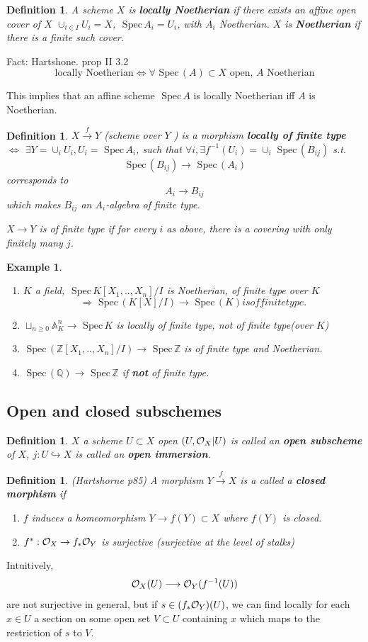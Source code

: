 \documentclass[11pt]{article}
\newtheorem{dfn}[thm]{Definition}
\newtheorem{ex}[thm]{Example}
\newcommand{\spec}{\text{ Spec}\,}
\newcommand{\affn}{\mathbb A}
\newcommand{\intg}{\mathbb Z}
\newcommand{\ratl}{\mathbb Q}
\newcommand{\calo}{{\cal O}}
\newcommand{\rta}{\rightarrow}
\newcommand{\Lrta}{\Longrightarrow}
\newcommand{\lrta}{\longrightarrow}
\newcommand{\Llrta}{\Longleftrightarrow}
\newcommand{\inj}{\hookrightarrow}
\begin{document}
\begin{dfn}
A scheme $X$ is \textbf{locally Noetherian} if there exists an affine open cover of $X$
$\cup_{i\in I} U_i=X$, $\spec A_i=U_i$, with $A_i$ Noetherian. $X$ is \textbf{Noetherian} if there is a  finite such cover.
\end{dfn}
Fact: Hartshone. prop II 3.2
$$
\text{locally Noetherian}\Llrta \forall \spec(A)\subset X \text{ open, } A \text{ Noetherian}
$$

This implies that an affine scheme $\spec A$ is locally Noetherian iff $A$ is Noetherian.

\begin{dfn}
$X\overset{f}{\lrta } Y$ (scheme over $Y$ ) is a morphism \textbf{locally of finite type} $\Llrta$ $\exists Y=\cup_i U_i, U_i=\spec A_i$, such that $\forall i, \exists f^{-1}(U_i)=\cup_i \spec(B_{ij})$ s.t.
$$
\spec(B_{ij})\lrta \spec(A_i)
$$
corresponds to 
$$
A_i\lrta B_{ij}
$$
which makes $B_{ij}$ an $A_i$-algebra of finite type.

$X\lrta Y$ is of finite type if for every $i$ as above, there is a covering with only finitely many $j$.
\end{dfn}
\begin{ex}\ 
\begin{enumerate}[label=(\arabic*)]
\item $K$ a field, $\spec K[X_1,..,X_n]/I$ is Noetherian, of finite type over $K$
$$
\Lrta \spec(K[X]/I)\lrta \spec(K) is of finite type.
$$
\item $\sqcup_{n\geq 0}\affn^n_K\lrta \spec K$ is locally of finite type, not of finite type(over $K$)
\item $\spec (\intg[X_1,..,X_n]/I)\lrta\spec \intg$ is of finite type and Noetherian.
\item $\spec(\ratl)\lrta \spec \intg$ if \textbf{not} of finite type.
\end{enumerate}
\end{ex}
\subsection*{Open and closed subschemes}
\begin{dfn}
$X$ a scheme $U\subset X$ open $(U,\calo_X|U)$ is called an \textbf{open subscheme} of $X$, $j:U\inj  X$ is called an \textbf{open immersion}.
\end{dfn}
\begin{dfn}
(Hartshorne p85) A morphism $Y\overset{f}{\lrta}X$ is a called a \textbf{closed morphism} if 
\begin{enumerate}[label=(\arabic*)]
\item $f$ induces a homeomorphism $Y\lrta f(Y)\subset X$ where $f(Y)$  is closed.
\item
$f^*:\calo_X\rta f_*\calo_Y$ is surjective (surjective at the level of stalks)
\end{enumerate}
\end{dfn}
Intuitively,
$$
\calo_X(U)\lrta \calo_Y(f^{-1}(U))
$$
are not surjective  in general, but  if $s\in(f_*\calo_Y)(U)$, we can find locally  for each $x\in U$ a section  on some open set $V\subset U$ containing $x$ which maps to the restriction of $s$ to $V$.
\end{document}
